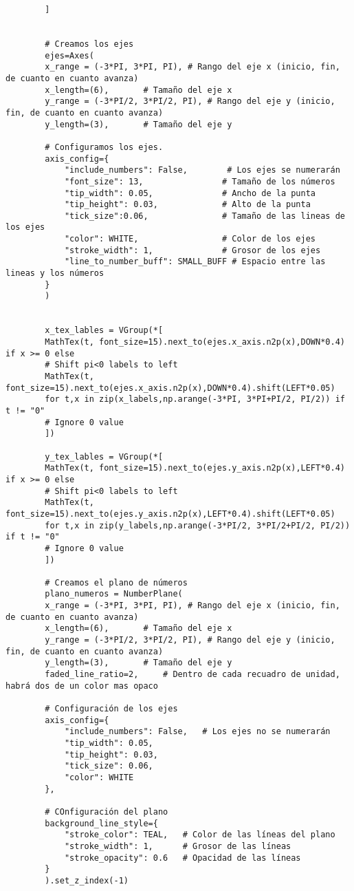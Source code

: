 \begin{longlisting}
\begin{verbatim}
		]
		
		
		# Creamos los ejes
		ejes=Axes(
		x_range = (-3*PI, 3*PI, PI), # Rango del eje x (inicio, fin, de cuanto en cuanto avanza)
		x_length=(6),       # Tamaño del eje x
		y_range = (-3*PI/2, 3*PI/2, PI), # Rango del eje y (inicio, fin, de cuanto en cuanto avanza)
		y_length=(3),       # Tamaño del eje y
		
		# Configuramos los ejes.
		axis_config={
			"include_numbers": False,        # Los ejes se numerarán
			"font_size": 13,                # Tamaño de los números
			"tip_width": 0.05,              # Ancho de la punta
			"tip_height": 0.03,             # Alto de la punta
			"tick_size":0.06,               # Tamaño de las lineas de los ejes
			"color": WHITE,                 # Color de los ejes
			"stroke_width": 1,              # Grosor de los ejes
			"line_to_number_buff": SMALL_BUFF # Espacio entre las lineas y los números
		}       
		)
		
		
		x_tex_lables = VGroup(*[
		MathTex(t, font_size=15).next_to(ejes.x_axis.n2p(x),DOWN*0.4) if x >= 0 else
		# Shift pi<0 labels to left
		MathTex(t, font_size=15).next_to(ejes.x_axis.n2p(x),DOWN*0.4).shift(LEFT*0.05)
		for t,x in zip(x_labels,np.arange(-3*PI, 3*PI+PI/2, PI/2)) if t != "0"
		# Ignore 0 value
		])
		
		y_tex_lables = VGroup(*[
		MathTex(t, font_size=15).next_to(ejes.y_axis.n2p(x),LEFT*0.4) if x >= 0 else
		# Shift pi<0 labels to left
		MathTex(t, font_size=15).next_to(ejes.y_axis.n2p(x),LEFT*0.4).shift(LEFT*0.05)
		for t,x in zip(y_labels,np.arange(-3*PI/2, 3*PI/2+PI/2, PI/2)) if t != "0"
		# Ignore 0 value
		])
		
		# Creamos el plano de números
		plano_numeros = NumberPlane(
		x_range = (-3*PI, 3*PI, PI), # Rango del eje x (inicio, fin, de cuanto en cuanto avanza)
		x_length=(6),       # Tamaño del eje x
		y_range = (-3*PI/2, 3*PI/2, PI), # Rango del eje y (inicio, fin, de cuanto en cuanto avanza)
		y_length=(3),       # Tamaño del eje y
		faded_line_ratio=2,     # Dentro de cada recuadro de unidad, habrá dos de un color mas opaco
		
		# Configuración de los ejes
		axis_config={
			"include_numbers": False,   # Los ejes no se numerarán
			"tip_width": 0.05, 
			"tip_height": 0.03, 
			"tick_size": 0.06, 
			"color": WHITE
		},
		
		# COnfiguración del plano
		background_line_style={
			"stroke_color": TEAL,   # Color de las líneas del plano
			"stroke_width": 1,      # Grosor de las líneas
			"stroke_opacity": 0.6   # Opacidad de las líneas
		}
		).set_z_index(-1)
		

\end{verbatim}
\end{longlisting}
